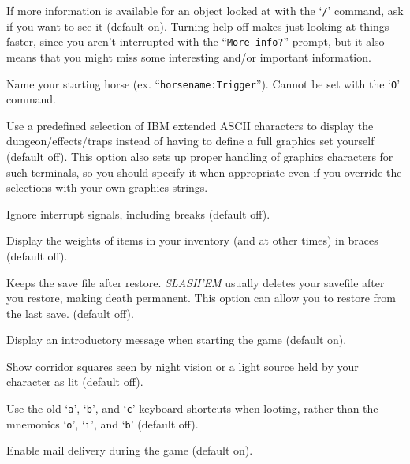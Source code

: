 \item[\ib{help}]
If more information is available for an object looked at
with the `{\tt /}' command, ask if you want to see it (default on). Turning help
off makes just looking at things faster, since you aren't interrupted with the
``{\tt More info?}'' prompt, but it also means that you might miss some
interesting and/or important information.

\item[\ib{horsename}]
Name your starting horse (ex. ``{\tt horsename:Trigger}'').
Cannot be set with the `{\tt O}' command.

\item[\ib{IBMgraphics}]
Use a predefined selection of IBM extended ASCII characters to display the
dungeon/effects/traps instead of having to define a full graphics set
yourself (default off).
This option also sets up proper handling of graphics
characters for such terminals, so you should specify it when appropriate
even if you override the selections with your own graphics strings.

\item[\ib{ignintr}]
Ignore interrupt signals, including breaks (default off).

\item[\ib{invweight}]
Display the weights of items in your inventory (and at other times)
in braces (default off).

\item[\ib{keep\_savefile}]
Keeps the save file after restore.  {\it SLASH'EM\/} usually deletes your savefile
after you restore,  making death permanent.  This option can allow you to
restore from the last save. (default off).

\item[\ib{legacy}]
Display an introductory message when starting the game (default on).

\item[\ib{lit\_corridor}]
Show corridor squares seen by night vision or a light source held by your
character as lit (default off).

\item[\ib{lootabc}]
Use the old `{\tt a}', `{\tt b}', and `{\tt c}' keyboard shortcuts when
looting, rather than the mnemonics `{\tt o}', `{\tt i}', and `{\tt b}' (default off).

\item[\ib{mail}]
Enable mail delivery during the game (default on).

